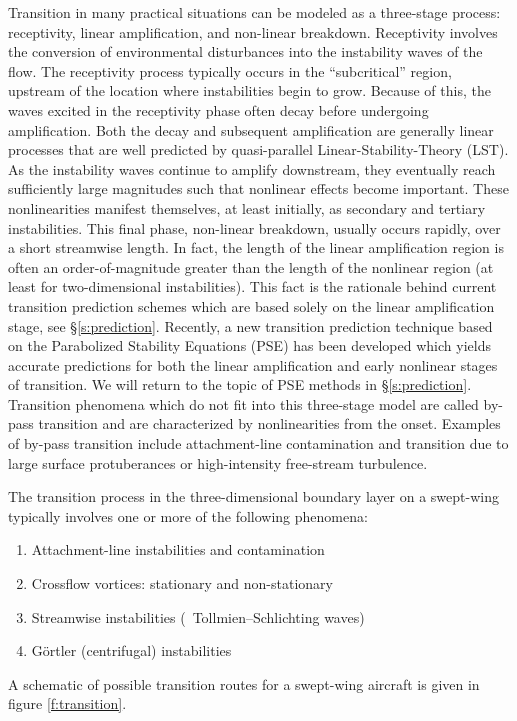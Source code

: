 Transition in many practical situations can be modeled as a three-stage
process: receptivity, linear amplification, and non-linear breakdown.
Receptivity involves the conversion of environmental disturbances into the
instability waves of the flow.  The receptivity process typically occurs in
the ``subcritical'' region, upstream of the location where instabilities begin
to grow.  Because of this, the waves excited in the receptivity phase often
decay before undergoing amplification.  Both the decay and subsequent
amplification are generally linear processes that are well predicted by
quasi-parallel Linear-Stability-Theory (LST).  As the instability waves
continue to amplify downstream, they eventually reach sufficiently large
magnitudes such that nonlinear effects become important.  These nonlinearities
manifest themselves, at least initially, as secondary and tertiary
instabilities.  This final phase, non-linear breakdown, usually occurs
rapidly, over a short streamwise length.  In fact, the length of the linear
amplification region is often an order-of-magnitude greater than the length of
the nonlinear region (at least for two-dimensional instabilities).  This fact
is the rationale behind current transition prediction schemes which are based
solely on the linear amplification stage, see \S\ref{s:prediction}.  Recently,
a new transition prediction technique based on the Parabolized Stability
Equations (PSE) \cite{Herbert:91} has been developed which yields accurate
predictions for both the linear amplification and early nonlinear stages of
transition.  We will return to the topic of PSE methods in
\S\ref{s:prediction}.  Transition phenomena which do not fit into this
three-stage model are called by-pass transition and are characterized by
nonlinearities from the onset.  Examples of by-pass transition include
attachment-line contamination and transition due to large surface
protuberances or high-intensity free-stream turbulence.

The transition process in the three-dimensional boundary layer on a swept-wing
typically involves one or more of the following phenomena:
%
\begin{enumerate}
  \item {Attachment-line instabilities and contamination}
  \item {Crossflow vortices: stationary and non-stationary}
  \item {Streamwise instabilities (\ie\ Tollmien--Schlichting waves)}
  \item {G\"ortler (centrifugal) instabilities }
\end{enumerate}
%
A schematic of possible transition routes for a swept-wing aircraft is given
in figure \ref{f:transition}.

